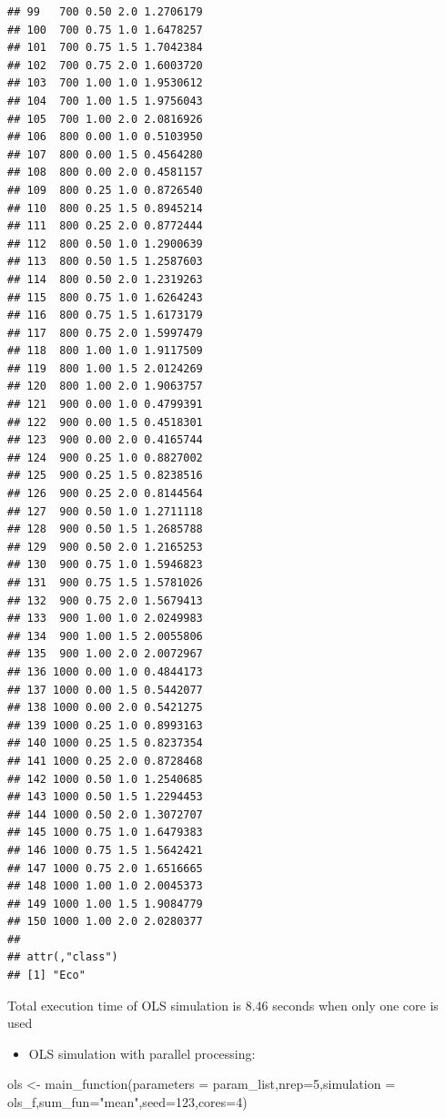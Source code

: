 \documentclass[11pt,a4paper]{article}
\newenvironment{Shaded}{\begin{snugshade}}{\end{snugshade}}
\newcommand{\AttributeTok}[1]{\textcolor[rgb]{0.77,0.63,0.00}{#1}}
\newcommand{\DecValTok}[1]{\textcolor[rgb]{0.00,0.00,0.81}{#1}}
\newcommand{\FunctionTok}[1]{\textcolor[rgb]{0.00,0.00,0.00}{#1}}
\newcommand{\NormalTok}[1]{#1}
\newcommand{\OtherTok}[1]{\textcolor[rgb]{0.56,0.35,0.01}{#1}}
\newcommand{\StringTok}[1]{\textcolor[rgb]{0.31,0.60,0.02}{#1}}
\begin{document}
\begin{verbatim}
## 99   700 0.50 2.0 1.2706179
## 100  700 0.75 1.0 1.6478257
## 101  700 0.75 1.5 1.7042384
## 102  700 0.75 2.0 1.6003720
## 103  700 1.00 1.0 1.9530612
## 104  700 1.00 1.5 1.9756043
## 105  700 1.00 2.0 2.0816926
## 106  800 0.00 1.0 0.5103950
## 107  800 0.00 1.5 0.4564280
## 108  800 0.00 2.0 0.4581157
## 109  800 0.25 1.0 0.8726540
## 110  800 0.25 1.5 0.8945214
## 111  800 0.25 2.0 0.8772444
## 112  800 0.50 1.0 1.2900639
## 113  800 0.50 1.5 1.2587603
## 114  800 0.50 2.0 1.2319263
## 115  800 0.75 1.0 1.6264243
## 116  800 0.75 1.5 1.6173179
## 117  800 0.75 2.0 1.5997479
## 118  800 1.00 1.0 1.9117509
## 119  800 1.00 1.5 2.0124269
## 120  800 1.00 2.0 1.9063757
## 121  900 0.00 1.0 0.4799391
## 122  900 0.00 1.5 0.4518301
## 123  900 0.00 2.0 0.4165744
## 124  900 0.25 1.0 0.8827002
## 125  900 0.25 1.5 0.8238516
## 126  900 0.25 2.0 0.8144564
## 127  900 0.50 1.0 1.2711118
## 128  900 0.50 1.5 1.2685788
## 129  900 0.50 2.0 1.2165253
## 130  900 0.75 1.0 1.5946823
## 131  900 0.75 1.5 1.5781026
## 132  900 0.75 2.0 1.5679413
## 133  900 1.00 1.0 2.0249983
## 134  900 1.00 1.5 2.0055806
## 135  900 1.00 2.0 2.0072967
## 136 1000 0.00 1.0 0.4844173
## 137 1000 0.00 1.5 0.5442077
## 138 1000 0.00 2.0 0.5421275
## 139 1000 0.25 1.0 0.8993163
## 140 1000 0.25 1.5 0.8237354
## 141 1000 0.25 2.0 0.8728468
## 142 1000 0.50 1.0 1.2540685
## 143 1000 0.50 1.5 1.2294453
## 144 1000 0.50 2.0 1.3072707
## 145 1000 0.75 1.0 1.6479383
## 146 1000 0.75 1.5 1.5642421
## 147 1000 0.75 2.0 1.6516665
## 148 1000 1.00 1.0 2.0045373
## 149 1000 1.00 1.5 1.9084779
## 150 1000 1.00 2.0 2.0280377
## 
## attr(,"class")
## [1] "Eco"
\end{verbatim}

Total execution time of OLS simulation is 8.46 seconds when only one
core is used

\begin{itemize}

\item
  OLS simulation with parallel processing:
\end{itemize}

\begin{Shaded}
\begin{Highlighting}[]
\NormalTok{ols }\OtherTok{\textless{}{-}} \FunctionTok{main\_function}\NormalTok{(}\AttributeTok{parameters =}\NormalTok{ param\_list,}\AttributeTok{nrep=}\DecValTok{5}\NormalTok{,}\AttributeTok{simulation =}\NormalTok{ ols\_f,}\AttributeTok{sum\_fun=}\StringTok{"mean"}\NormalTok{,}\AttributeTok{seed=}\DecValTok{123}\NormalTok{,}\AttributeTok{cores=}\DecValTok{4}\NormalTok{)}
\end{Highlighting}
\end{Shaded}
\end{document}
